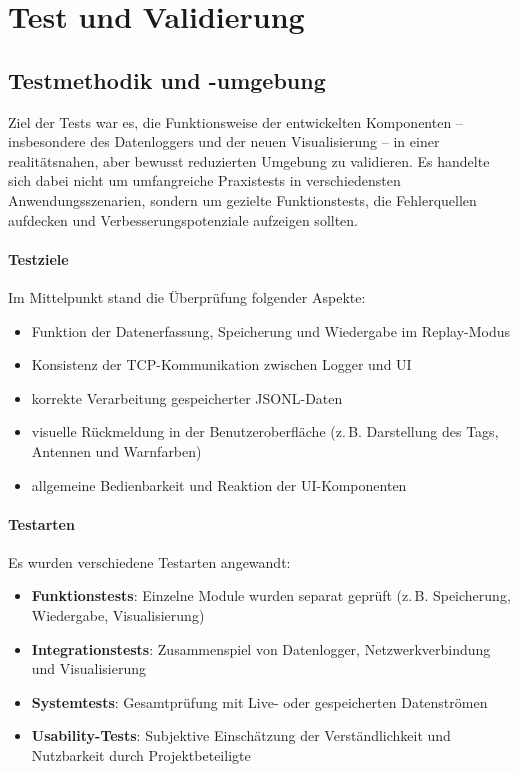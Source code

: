 \documentclass[a4paper, 12pt]{article} %
\begin{document}
 \clearpage

\section{Test und Validierung}
\subsection{Testmethodik und -umgebung}

Ziel der Tests war es, die Funktionsweise der entwickelten Komponenten -- insbesondere des Datenloggers und der neuen Visualisierung -- in einer 
realitätsnahen, aber bewusst reduzierten Umgebung zu validieren. Es handelte sich dabei nicht um umfangreiche Praxistests in verschiedensten 
Anwendungsszenarien, sondern um gezielte Funktionstests, die Fehlerquellen aufdecken und Verbesserungspotenziale aufzeigen sollten.

\paragraph{Testziele}
Im Mittelpunkt stand die Überprüfung folgender Aspekte:
\begin{itemize}
    \item Funktion der Datenerfassung, Speicherung und Wiedergabe im Replay-Modus
    \item Konsistenz der TCP-Kommunikation zwischen Logger und \ac{UI}
    \item korrekte Verarbeitung gespeicherter \ac{JSONL}-Daten
    \item visuelle Rückmeldung in der Benutzeroberfläche (z.\,B. Darstellung des Tags, Antennen und Warnfarben)
    \item allgemeine Bedienbarkeit und Reaktion der UI-Komponenten
\end{itemize}

\paragraph{Testarten}
Es wurden verschiedene Testarten angewandt:
\begin{itemize}
    \item \textbf{Funktionstests}: Einzelne Module wurden separat geprüft (z.\,B. Speicherung, Wiedergabe, Visualisierung)
    \item \textbf{Integrationstests}: Zusammenspiel von Datenlogger, Netzwerkverbindung und Visualisierung
    \item \textbf{Systemtests}: Gesamtprüfung mit Live- oder gespeicherten Datenströmen
    \item \textbf{Usability-Tests}: Subjektive Einschätzung der Verständlichkeit und Nutzbarkeit durch Projektbeteiligte
\end{itemize}
\end{document}
